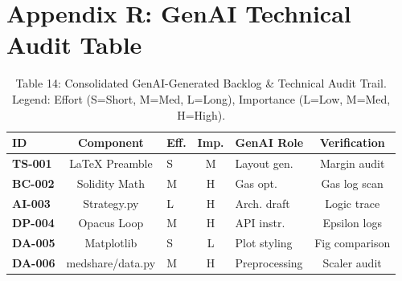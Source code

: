 \documentclass[10pt, a4paper, twocolumn]{article}
\begin{document}
\section*{Appendix R: GenAI Technical Audit Table}
\begin{table}[hbt!]
\centering
\scriptsize
\begin{tabular}{lcp{1.2cm}cp{1.4cm}c}
\toprule
\textbf{ID} & \textbf{Component} & \textbf{Eff.} & \textbf{Imp.} & \textbf{GenAI Role} & \textbf{Verification} \\
\midrule
\textbf{TS-001} & LaTeX Preamble & S & M & Layout gen. & Margin audit \\
\textbf{BC-002} & Solidity Math & M & H & Gas opt. & Gas log scan \\
\textbf{AI-003} & Strategy.py & L & H & Arch. draft & Logic trace \\
\textbf{DP-004} & Opacus Loop & M & H & API instr. & Epsilon logs \\
\textbf{DA-005} & Matplotlib & S & L & Plot styling & Fig comparison \\
\textbf{DA-006} & medshare/data.py & M & H & Preprocessing & Scaler audit \\
\bottomrule
\end{tabular}
\caption{Table 14: Consolidated GenAI-Generated Backlog \& Technical Audit Trail. Legend: Effort (S=Short, M=Med, L=Long), Importance (L=Low, M=Med, H=High).}
\end{table}
\end{document}
